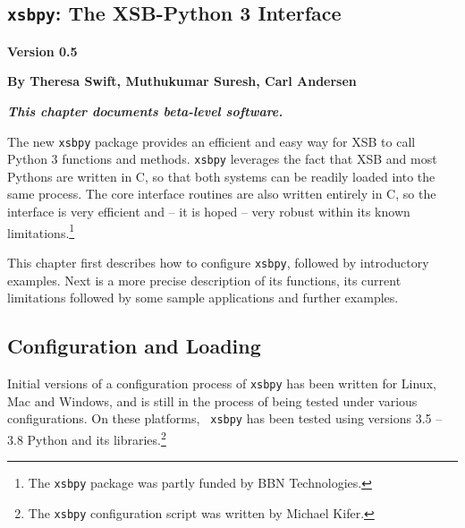
\newcommand{\xsbpyversion}{Version 0.5}

\begin{center}
\chapter[XSB and Python]{{\tt xsbpy}: The XSB-Python 3 Interface} \label{chap:xsbpy}
\end{center}

\vspace*{-.30in} 
\begin{center}
{\Large {\bf  \xsbpyversion}}
\end{center}

\begin{center}
  {\Large {\bf By Theresa Swift, Muthukumar Suresh, Carl Andersen}}
\end{center}

\noindent
{\large {\bf {\em This chapter documents beta-level software.}}}

%

The new {\tt xsbpy} package provides an efficient and easy way for XSB
to call Python 3 functions and methods.  {\tt xsbpy} leverages the
fact that XSB and most Pythons are written in C, so that both systems
can be readily loaded into the same process. The core interface
routines are also written entirely in C, so the interface is very
efficient and -- it is hoped -- very robust within its known
limitations.\footnote{The {\tt xsbpy} package was partly funded by BBN
  Technologies.}

This chapter first describes how to configure {\tt xsbpy}, followed by
introductory examples.  Next is a more precise description of its
functions, its current limitations followed by some sample
applications and further examples.

\section{Configuration and Loading}

Initial versions of a configuration process of {\tt xsbpy} has been
written for Linux, Mac and Windows, and is still in the process of
being tested under various configurations.  On these platforms, {\tt
  xsbpy} has been tested using versions 3.5 -- 3.8 Python and its
libraries.\footnote{The {\tt xsbpy} configuration script was written
  by Michael Kifer.}

